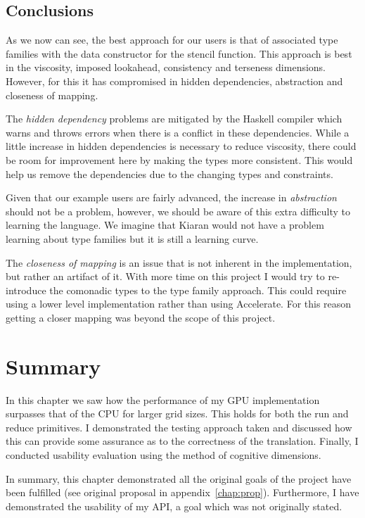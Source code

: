 \documentclass[12pt,a4paper,twoside]{scrbook}
\begin{document}
\subsection{Conclusions}

As we now can see, the best approach for our users is that of associated type
families with the data constructor for the stencil function. This approach is
best in the viscosity, imposed lookahead, consistency and terseness
dimensions. However, for this it has compromised in hidden dependencies,
abstraction and closeness of mapping.

The \emph{hidden dependency} problems are mitigated by the Haskell
compiler which warns and throws errors when there is a conflict in these
dependencies. While a little increase in hidden dependencies is
necessary to reduce viscosity, there could be room for improvement here
by making the types more consistent. This would help us remove the
dependencies due to the changing types and constraints.

Given that our example users are fairly advanced, the increase in
\emph{abstraction} should not be a problem, however, we should be aware of this
extra difficulty to learning the language. We imagine that Kiaran would not have
a problem learning about type families but it is still a learning curve.

The \emph{closeness of mapping} is an issue that is not inherent in the
implementation, but rather an artifact of it. With more time on this
project I would try to re-introduce the comonadic types to the type
family approach. This could require using a lower level implementation
rather than using Accelerate. For this reason getting a closer mapping
was beyond the scope of this project.

\section{Summary}

In this chapter we saw how the performance of my GPU implementation surpasses
that of the CPU for larger grid sizes. This holds for both the run and reduce
primitives. I demonstrated the testing approach taken and discussed how this can
provide some assurance as to the correctness of the translation. Finally, I
conducted usability evaluation using the method of cognitive dimensions.

In summary, this chapter demonstrated all the original goals of the project have
been fulfilled (see original proposal in appendix~\ref{chap:prop}). Furthermore,
I have demonstrated the usability of my API, a goal which was not originally
stated.
\end{document}
